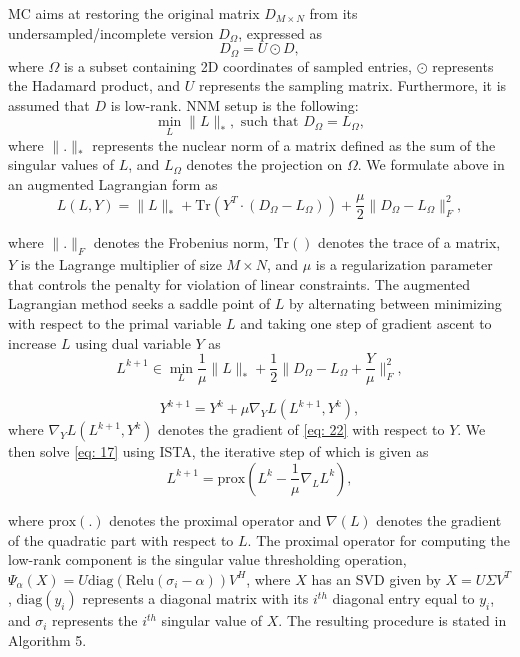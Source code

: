 MC aims at restoring the original matrix $D_{M \times N}$ from its undersampled/incomplete version $D_{\Omega}$, expressed as
\[ D_{\Omega} = U \odot D, \]
where $\Omega$ is a subset containing 2D coordinates of sampled entries, $\odot$ represents the Hadamard product, and $U$ represents the sampling matrix. Furthermore, it is assumed that $D$ is low-rank. NNM setup is the following:
\[
\min_L \|L\|_*, \text{ such that } D_{\Omega} = L_{\Omega},
\]
where $\|.\|_*$ represents the nuclear norm of a matrix defined as the sum of the singular values of $L$, and $L_{\Omega}$ denotes the projection on $\Omega$. We formulate above in an augmented Lagrangian form as
\begin{equation}
    L(L, Y) = \|L\|_* + \text{Tr}(Y^T \cdot (D_{\Omega} - L_{\Omega})) + \frac{\mu}{2} \|D_{\Omega} - L_{\Omega}\|_F^2,
\label{eq: 22}
\end{equation}

where $\|.\|_F$ denotes the Frobenius norm, $\text{Tr}()$ denotes the trace of a matrix, $Y$ is the Lagrange multiplier of size $M \times N$, and $\mu$ is a regularization parameter that controls the penalty for violation of linear constraints. The augmented Lagrangian method seeks a saddle point of $L$ by alternating between minimizing with respect to the primal variable $L$ and taking one step of gradient ascent to increase $L$ using dual variable $Y$ as
\begin{equation}
    L^{k+1} \in \min_L \frac{1}{\mu} \|L\|_* + \frac{1}{2}  \|D_{\Omega} - L_{\Omega} + \frac{Y}{\mu}\|_F^2,
    \label{eq: 17}
\end{equation}

\[ 
Y^{k+1} = Y^k + \mu \nabla_Y L(L^{k+1}, Y^k),
\]
where $\nabla_Y L(L^{k+1}, Y^k)$ denotes the gradient of \ref{eq: 22} with respect to $Y$. We then solve \ref{eq: 17} using ISTA, the iterative step of which is given as
\begin{equation}
    L^{k+1} = \text{prox} \left( L^k - \frac{1}{\mu} \nabla_L L^k \right),
    \label{eq: 18}
\end{equation}

where $\text{prox} (.)$ denotes the proximal operator and $\nabla(L)$ denotes the gradient of the quadratic part with respect to $L$. The proximal operator for computing the low-rank component is the singular value thresholding operation, $\Psi_{\alpha}(X) = U \text{diag}(\text{Relu}(\sigma_i - \alpha))V^H$, where $X$ has an SVD given by $X = U\Sigma V^T$, $\text{diag}(y_i)$ represents a diagonal matrix with its $i^{th}$ diagonal entry equal to $y_i$, and $\sigma_i$ represents the $i^{th}$ singular value of $X$. The resulting procedure is stated in Algorithm 5. 

